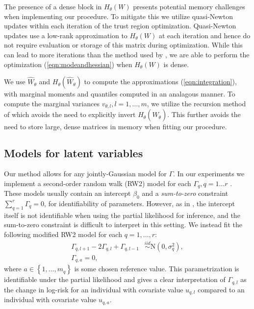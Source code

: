 \documentclass[]{article}
\begin{document}
The presence of a dense block in $H_{\theta}(W)$ presents potential memory challenges when implementing our procedure. To mitigate this we utilize quasi-Newton updates within each iteration of the trust region optimization. Quasi-Newton updates use a low-rank approximation to $H_{\theta}(W)$ at each iteration and hence do not require evaluation or storage of this matrix during optimization. While this can lead to more iterations than the method used by \citet{casecross}, we are able to perform the optimization (\ref{eqn:modeandhessian}) when $H_{\theta}(W)$ is dense.

We use $\widehat{W}_{\theta}$ and $H_{\theta}(\widehat{W}_{\theta})$ to compute the approximations (\ref{eqn:integration}), with marginal moments and quantiles computed in an analagous manner. To compute the marginal variances $v_{\theta,l},l = 1,\ldots,m$, we utilize the recursion method of \citet{gmrfmodels} which avoids the need to explicitly invert $H_{\theta}(\widehat{W}_{\theta})$. This further avoids the need to store large, dense matrices in memory when fitting our procedure.

\subsection{Models for latent variables}\label{subsec:latent}

Our method allows for any jointly-Gaussian model for $\Gamma$. In our experiments we implement a second-order random walk (RW2) model for each $\Gamma_{q},q = 1\ldots r$ \citep{rw2}. These models usually contain an intercept $\beta_{0}$ and a \emph{sum-to-zero} constraint $\sum_{q=1}^{r}\Gamma_{q} = 0$, for identifiability of parameters. However, as in \citet{casecross}, the intercept itself is not identifiable when using the partial likelihood for inference, and the sum-to-zero constraint is difficult to interpret in this setting. We instead fit the following modified RW2 model for each $q = 1,\ldots,r$:
\begin{equation}\begin{aligned}\label{eqn:rw2}
\Gamma_{q,l+1} - 2\Gamma_{q,l} + \Gamma_{q,l-1} &\overset{iid}{\sim}\text{N}\left( 0,\sigma^{2}_{q}\right), \\
\Gamma_{q,a} = 0,
\end{aligned}\end{equation}
where $a\in\left\lbrace 1,\ldots,m_{q}\right\rbrace$ is some chosen reference value. This parametrization is identifiable under the partial likelihood and gives a clear interpretation of $\Gamma_{q,l}$ as the change in log-risk for an individual with covariate value $u_{q,l}$ compared to an individual with covariate value $u_{q,a}$. 
\end{document}
